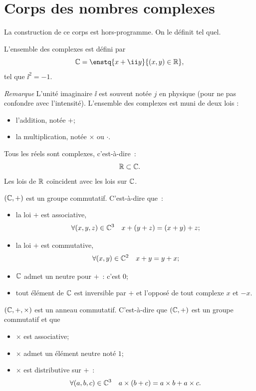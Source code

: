 \section{Corps des nombres complexes}
\label{sec:corpsdescomplexes}
La construction de ce corps est hors-programme. On le définit tel quel.
\begin{defdef}
  L'ensemble des complexes est défini par 
  \begin{equation} 
    \C = \enstq{x+ \ii y}{(x,y)\in \R},
  \end{equation}
  tel que $\ii^2=-1$.
\end{defdef}
\emph{Remarque} L'unité imaginaire $\ii$ est souvent notée $j$ en physique (pour ne pas confondre avec l'intensité). L'ensemble des complexes est muni de deux lois :
\begin{itemize}
\item l'addition, notée $+$;
\item la multiplication, notée $\times$ ou $\cdot$.
\end{itemize}
%
\begin{prop} Tous les réels sont complexes, c'est-à-dire~:
  \begin{equation} 
    \mathbb{R} \subset \mathbb{C}.
  \end{equation}
  Les lois de $\mathbb{R}$ coïncident avec les lois sur $\mathbb{C}$.
\end{prop}
%
\begin{prop} 
  $(\mathbb{C},+)$ est un groupe commutatif. C'est-à-dire que~:
  \begin{itemize}
  \item la loi $+$ est associative,
    \begin{equation}
      \forall (x,y,z) \in \mathbb{C}^3 \quad x+(y+z)=(x+y)+z;
    \end{equation}
  \item la loi $+$ est commutative,
    \begin{equation}
      \forall (x,y) \in \mathbb{C}^2 \quad x+y=y+x;
    \end{equation}
  \item $\mathbb{C}$ admet un neutre pour $+$~: c'est $0$;
  \item tout élément de $\mathbb{C}$ est inversible par $+$ et l'opposé de tout complexe $x$ et $-x$.
  \end{itemize}
\end{prop}
%
\begin{prop} 
  $(\mathbb{C},+,\times)$ est un anneau commutatif. C'est-à-dire que $(\mathbb{C},+)$ est un groupe commutatif et que
  \begin{itemize}
  \item $\times$ est associative;
  \item $\times$ admet un élément neutre noté $1$;
  \item $\times$ est distributive sur $+$~:
    \begin{equation}
      \forall (a,b,c) \in \mathbb{C}^3 \quad a \times (b+c)=a \times b+ a \times c.
    \end{equation}
\end{itemize}
\end{prop}
